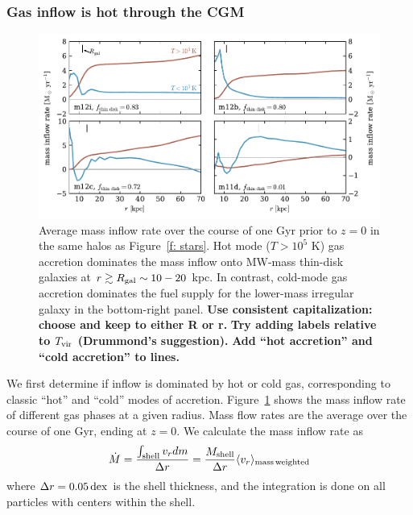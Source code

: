 \documentclass[fleqn,usenatbib]{mnras}
\newcommand{\Mdot}{\dot{M}}
\begin{document}
\subsubsection{Gas inflow is hot through the CGM}
\label{s: characteristics -- inflowing gas phase}

\begin{figure}
    \centering
    \includegraphics{figures/Mdot.pdf}
    \caption{
    Average mass inflow rate over the course of one Gyr prior to $z=0$ in the same halos as Figure~\ref{f: stars}.
    Hot mode ($T>10^5$ K) gas accretion dominates the mass inflow onto MW-mass thin-disk galaxies at $r \gtrsim R_{\rm gal} \sim 10-20$ kpc.
    In contrast, cold-mode gas accretion dominates the fuel supply for the lower-mass irregular galaxy in the bottom-right panel.
    \textbf{Use consistent capitalization: choose and keep to either R or r.}
    \textbf{Try adding labels relative to $T_{\rm vir}$ (Drummond's suggestion).}
    \textbf{Add ``hot accretion'' and ``cold accretion'' to lines.}
    }
    \label{f: Mdot}
\end{figure}

We first determine if inflow is dominated by hot or cold gas, corresponding to classic ``hot'' and ``cold'' modes of accretion.
Figure~\ref{f: Mdot} shows the mass inflow rate of different gas phases at a given radius.
Mass flow rates are the average over the course of one Gyr, ending at $z=0$.
We calculate the mass inflow rate as
\begin{equation}
     \Mdot = \frac{\int_{\rm shell} v_r dm}{\Delta r} = \frac{M_{\rm shell}}{\Delta r} \langle v_r\rangle_{\rm mass\, weighted}
     \label{e: Mdot}
\end{equation}
where $\Delta r=0.05\,{\rm dex}$ is the shell thickness, and the integration is done on all particles with centers within the shell.
\end{document}
